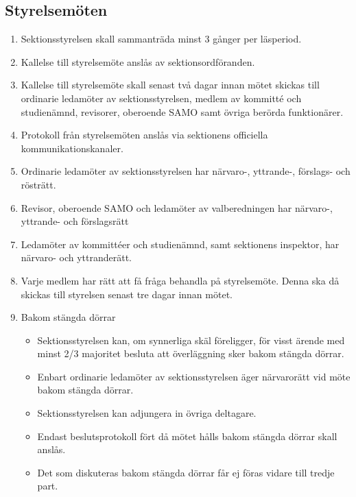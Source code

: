 \documentclass[11pt,a4paper]{article}
\begin{document}
\subsection{Styrelsemöten}

\begin{enumerate}[\thesubsection .1]

\item Sektionsstyrelsen skall sammanträda minst 3 gånger per läsperiod.

\item Kallelse till styrelsemöte anslås av sektionsordföranden.

\item Kallelse till styrelsemöte skall senast två dagar innan mötet skickas till ordinarie ledamöter av sektionsstyrelsen, medlem av kommitté och studienämnd, revisorer, oberoende SAMO samt övriga berörda funktionärer.

\item Protokoll från styrelsemöten anslås via sektionens officiella kommunikationskanaler.

\item Ordinarie ledamöter av sektionsstyrelsen har närvaro-, yttrande-, förslags- och rösträtt. 

\item Revisor, oberoende SAMO och ledamöter av valberedningen har närvaro-, yttrande- och förslagsrätt

\item Ledamöter av kommittéer och studienämnd, samt sektionens inspektor, har närvaro- och yttranderätt.

\item Varje medlem har rätt att få fråga behandla på styrelsemöte. Denna ska då skickas till styrelsen senast tre dagar innan mötet.


\item Bakom stängda dörrar

\begin{itemize}
\item Sektionsstyrelsen kan, om synnerliga skäl föreligger, för visst ärende med minst 2/3 majoritet besluta att överläggning sker bakom stängda dörrar.
\item Enbart ordinarie ledamöter av sektionsstyrelsen äger närvarorätt vid möte bakom stängda dörrar.
\item Sektionsstyrelsen kan adjungera in övriga deltagare.
\item Endast beslutsprotokoll fört då mötet hålls bakom stängda dörrar skall anslås.
\item Det som diskuteras bakom stängda dörrar får ej föras vidare till tredje part. 
\end{itemize}

\end{enumerate}
\end{document}
